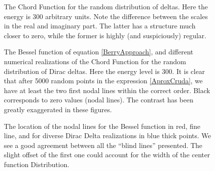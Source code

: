 \documentclass[a4paper,12pt]{article}
\begin{document}
\begin{figure}
\begin{center}
\caption{The Chord Function for the random distribution of deltas. 
Here the energy is $300$ arbitrary units. Note the difference between
the scales in the real and imaginary part. The latter has a structure much
closer to zero, while the former is highly (and suspiciously) regular.}
\label{XiFunction01}
\end{center}
\end{figure}


\begin{figure}
\begin{center}
\caption{The Bessel function of equation \ref{BerryApproach},
and different numerical realizations of the
Chord Function for the random distribution of Dirac deltas.
Here the energy level is $300$. It is clear that  
after 5000 random points in the expression \ref{AproxCruda},
we have at least the two first nodal lines within the correct
order. Black corresponds to zero values (nodal lines). 
The contrast has been greatly exaggerated in these figures.}
\label{BesselCompare01}
\end{center}
\end{figure}


\begin{figure}
\begin{center}
\caption{The location of the nodal lines for the Bessel
function in red, fine line, and for diverse 
Dirac Delta realizations in blue thick points. We see a good
agreement between all the ``blind lines'' presented.
The slight offset of the first one could account for the
width of the center function Distribution.}
\label{BesselCompareZeros}
\end{center}
\end{figure}
\end{document}
